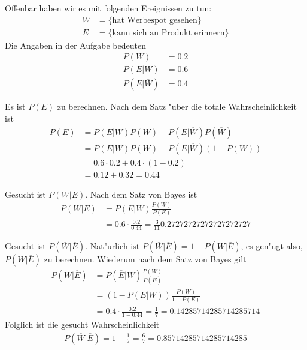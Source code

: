 \begin{loesung}
Offenbar haben wir es mit folgenden Ereignissen zu tun:
\begin{align*}
W&=\{\text{hat Werbespot gesehen}\}
\\
E&=\{\text{kann sich an Produkt erinnern}\}
\end{align*}
Die Angaben in der Aufgabe bedeuten
\begin{align*}
P(W)&=0.2\\
P(E|W)&=0.6\\
P(E|\overline W)&=0.4
\end{align*}
\begin{teilaufgaben}
\item Es ist $P(E)$ zu berechnen. Nach dem Satz "uber die totale
Wahrscheinlichkeit ist
\begin{align*}
P(E)&=P(E|W)P(W)+P(E|\overline W)P(\overline W)\\
&=P(E|W)P(W)+P(E|\overline W)(1-P(W))\\
&=0.6\cdot 0.2+0.4\cdot (1-0.2)\\
&=0.12+0.32=0.44
\end{align*}
\item Gesucht ist $P(W|E)$. Nach dem Satz von Bayes ist
\begin{align*}
P(W|E)&=P(E|W)\frac{P(W)}{P(E)}\\
&=0.6\cdot\frac{0.2}{0.44}=\frac{3}{11}
0.27272727272727272727
\end{align*}
\item Gesucht ist $P(\overline W|\overline E)$. Nat"urlich ist
$P(\overline W|\overline E)=1-P(W|\overline E)$, es gen"ugt also,
$P(W|\overline E)$ zu berechnen. Wiederum nach dem Satz von Bayes
gilt
\begin{align*}
P(W|\overline E)
&=
P(\overline E|W)\frac{P(W)}{P(\overline E)}\\
&=
(1-P(E|W))\frac{P(W)}{1-P(E)}\\
&=
0.4\cdot\frac{0.2}{1-0.44}=\frac17
=
0.14285714285714285714
\end{align*}
Folglich ist die gesucht Wahrscheinlichkeit
\begin{align*}
P(\overline W|\overline E)=1-\frac17=\frac67=
0.85714285714285714285
\end{align*}
\end{teilaufgaben}
\end{loesung}

